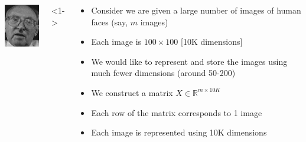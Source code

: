 \begin{frame}
\begin{columns}
\begin{overlayarea}{\textwidth}{\textheight}
\begin{minipage}[t]{0.15\textwidth}
      \end{minipage}
      \begin{minipage}[t]{0.15\textwidth}
        \includegraphics[width=\textwidth]{images/celebrity_images/s34_1.jpg}
      \end{minipage}
    \end{overlayarea}

    <1->
    \begin{overlayarea}{\textwidth}{\textheight}
      \begin{itemize}\justifying
        \item<1-> Consider we are given a large number of images of human faces (say, $m$ images)
        \item<2-> Each image is $100 \times 100$ [10K dimensions]
        \item<3-> We would like to represent and store the images using much fewer dimensions (around 50-200)
        \item<4-> We construct a matrix $X \in \mathbb{R}^{m \times 10K}$
        \item<5-> Each row of the matrix corresponds to 1 image
        \item<6-> Each image is represented using 10K dimensions
      \end{itemize}
    \end{overlayarea}
  \end{columns}
\end{frame}

